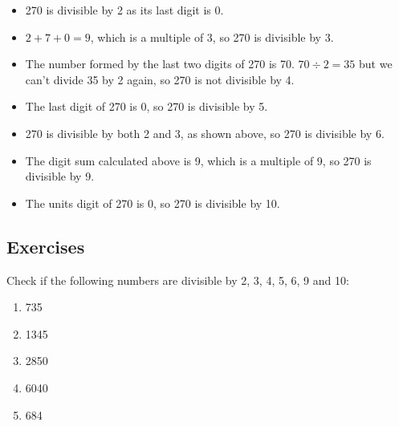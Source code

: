 \documentclass[11pt, oneside]{article}
\theoremstyle{definition}
\begin{document}
\begin{itemize}
\item 270 is divisible by 2 as its last digit is 0.
\item $2 + 7 + 0 = 9$, which is a multiple of 3, so 270 is divisible by 3.
\item The number formed by the last two digits of 270 is 70. $70 \div 2 = 35$ but we can't divide 35 by 2 again, so 270 is not divisible by 4.
\item The last digit of 270 is 0, so 270 is divisible by 5.
\item 270 is divisible by both 2 and 3, as shown above, so 270 is divisible by 6.
\item The digit sum calculated above is 9, which is a multiple of 9, so 270 is divisible by 9.
\item The units digit of 270 is 0, so 270 is divisible by 10.
\end{itemize}


\subsection{Exercises}
Check if the following numbers are divisible by 2, 3, 4, 5, 6, 9 and 10:
\begin{enumerate}
\item 735
\item 1345
\item 2850
\item 6040
\item 684
\end{enumerate}
\end{document}
